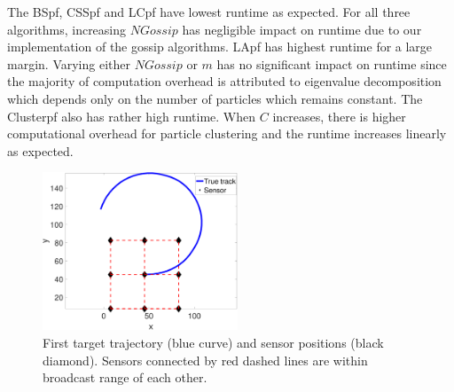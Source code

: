 \documentclass[10pt,letterpaper,final]{article}
\begin{document}
The BSpf, CSSpf and LCpf have lowest runtime as expected. For all three algorithms, increasing $NGossip$ has negligible impact on runtime due to our implementation of the gossip algorithms. LApf has highest runtime for a large margin. Varying either $NGossip$ or $m$ has no significant impact on runtime since the majority of computation overhead is attributed to eigenvalue decomposition which depends only on the number of particles which remains constant. The Clusterpf also has rather high runtime. When $C$ increases, there is higher computational overhead for particle clustering and the runtime increases linearly as expected.  

\begin{figure}
\centering
\includegraphics[width=0.52\textwidth]{Figures/track}
\caption{First target trajectory (blue curve) and sensor positions (black diamond). Sensors connected by red dashed lines are within broadcast range of each other.}
\label{fig:track3}
\end{figure}
\end{document}
